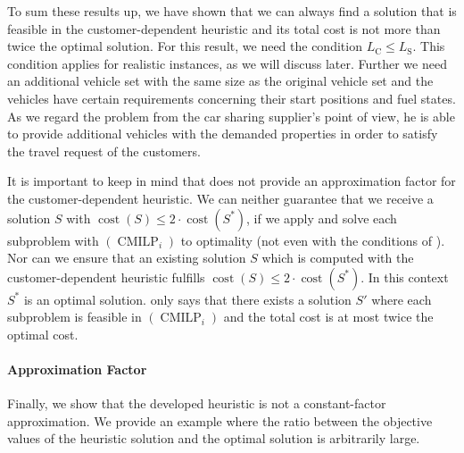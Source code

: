 To sum these results up, we have shown that we can always find a solution that is feasible in the customer-dependent heuristic and its total cost is not more than twice the optimal solution. For this result, we need the condition ${L_{\operatorname{C}}\leq L_{\operatorname{S}}}$. This condition applies for realistic instances, as we will discuss later. Further we need an additional vehicle set with the same size as the original vehicle set and the vehicles have certain requirements concerning their start positions and fuel states. As we regard the problem from the car sharing supplier's point of view, he is able to provide additional vehicles with the demanded properties in order to satisfy the travel request of the customers.

It is important to keep in mind that  does not provide an approximation factor for the customer-dependent heuristic. We can neither guarantee that we receive a solution $S$ with ${\operatorname{cost}\left(S\right)\leq 2\cdot\operatorname{cost}\left(S^*\right)}$, if we apply  and solve each subproblem with $(\operatorname{CMILP}_i)$ to optimality (not even with the conditions of ). Nor can we ensure that an existing solution $S$ which is computed with the customer-dependent heuristic fulfills ${\operatorname{cost}\left(S\right)\leq 2\cdot\operatorname{cost}\left(S^*\right)}$. In this context $S^*$ is an optimal solution.  only says that there exists a solution $S'$ where each subproblem is feasible in $(\operatorname{CMILP}_i)$ and the total cost is at most twice the optimal cost.

\paragraph{Approximation Factor} \parfill

Finally, we show that the developed heuristic is not a constant-factor approximation. We provide an example where the ratio between the objective values of the heuristic solution and the optimal solution is arbitrarily large.

